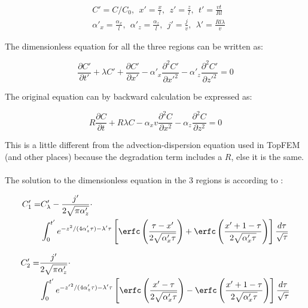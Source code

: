 \begin{equation}
\begin{split}
&C'=C/C_0, \ \ x'=\frac{x}{l},\ \ z'=\frac{z}{l}, \ \ t'=\frac{vt}{Rl}\\
&\alpha'_x=\frac{\alpha_x}{l}, \ \ \alpha'_z=\frac{\alpha_z}{l}, \ \
j'=\frac{j}{v}, \ \ \lambda'=\frac{Rl\lambda}{v}
\end{split}
\end{equation}

The dimensionless equation for all the three regions can be written as:

\begin{equation}
\frac{\partial C'}{\partial t'}+\lambda C'+\frac{\partial C'}{\partial
  x'}-\alpha'_{x}\frac{\partial^2 C'}{\partial
  {x'}^2}-\alpha'_z\frac{\partial^2 C'}{\partial {z'}^2}=0
\end{equation}

The original equation can by backward calculation be expressed as:

\begin{equation}
R \frac{\partial C}{\partial t}+R\lambda C
-\alpha_xv\frac{\partial^2 C}{\partial x^2}-\alpha_z\frac{\partial^2
  C}{\partial z^2}=0
\label{eq:advdispShan}
\end{equation}

This is a little different from the advection-dispersion equation used in
TopFEM (and other places) because the degradation term includes a $R$,
else it is the same.\\
\\

The solution to the dimensionless equation in the 3 regions is
according to \cite{Shan}:

\begin{equation}
\begin{split}
C'_1=& C'_{\lambda}-\frac{j'}{2\sqrt{\pi\alpha'_z}} \cdot \\
& \int_{0}^{t'} e^{-z^2/(4\alpha'_z\tau)-\lambda'
  \tau} \left[\erfc\left(\frac{\tau-x'}{2\sqrt{\alpha'_x\tau}}\right)+\erfc\left(\frac{x'+1-\tau}{2\sqrt{\alpha'_x\tau}}\right)\right]\frac{d
  \tau}{\sqrt{\tau}}
\end{split}
\label{eq:Cint_1}
\end{equation}

\begin{equation}
\begin{split}
C'_2=&\frac{j'}{2\sqrt{\pi\alpha'_z}} \cdot \\ &
\int_{0}^{t'}e^{{-z'}^2/(4\alpha'_z\tau)-\lambda'
  \tau}\left[\erfc\left(\frac{x'-\tau}{2\sqrt{\alpha'_x\tau}}\right)-\erfc\left(\frac{x'+1-\tau}{2\sqrt{\alpha'_x\tau}}\right)\right]\frac{d
  \tau}{\sqrt{\tau}}
\end{split}
\label{eq:Cint_2}
\end{equation}


